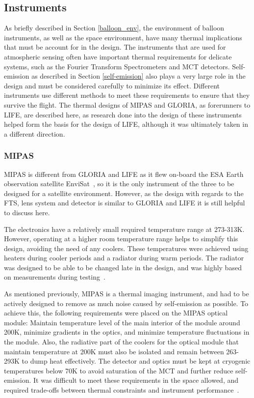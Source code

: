 \subsection{Instruments} \label{GLORIA_MIPAS_thermal}
As briefly described in Section \ref{balloon_env}, the environment of balloon instruments, as well as the space environment, have many thermal implications that must be account for in the design. The instruments that are used for atmospheric sensing often have important thermal requirements for delicate systems, such as the Fourier Transform Spectrometers and MCT detectors. Self-emission as described in Section \ref{self-emission} also plays a very large role in the design and must be considered carefully to minimize its effect. Different instruments use different methods to meet these requirements to ensure that they survive the flight. The thermal designs of MIPAS and GLORIA, as forerunners to LIFE, are described here, as research done into the design of these instruments helped form the basis for the design of LIFE, although it was ultimately taken in a different direction.

\subsubsection{MIPAS}
MIPAS is different from GLORIA and LIFE as it flew on-board the ESA Earth observation satellite EnviSat~\citep{MIPAS_thermal}, so it is the only instrument of the three to be designed for a satellite environment. However, as the design with regards to the FTS, lens system and detector is similar to GLORIA and LIFE it is still helpful to discuss here.

The electronics have a relatively small required temperature range at 273-313K. However, operating at a higher room temperature range helps to simplify this design, avoiding the need of any coolers. These temperatures were achieved using heaters during cooler periods and a radiator during warm periods. The radiator was designed to be able to be changed late in the design, and was highly based on measurements during testing~\citep{MIPAS_thermal}.

As mentioned previously, MIPAS is a thermal imaging instrument, and had to be actively designed to remove as much noise caused by self-emission as possible. To achieve this, the following requirements were placed on the MIPAS optical module: Maintain temperature level of the main interior of the module around 200K, minimize gradients in the optics, and minimize temperature fluctuations in the module. Also, the radiative part of the coolers for the optical module that maintain temperature at 200K must also be isolated and remain between 263-293K to dump heat effectively. The detector and optics must be kept at cryogenic temperatures below 70K to avoid saturation of the MCT and further reduce self-emission. It was difficult to meet these requirements in the space allowed, and required trade-offs between thermal constraints and instrument performance~\citep{MIPAS_thermal}. 


